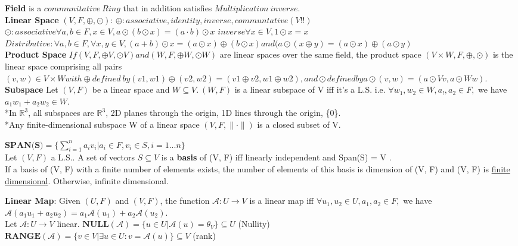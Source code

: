 \documentclass[10pt,landscape]{article}
\begin{document}
\begin{multicols*}{4}
\textbf{Field} is a $communitative\ Ring$ that in addition satisfies $Multiplication\ inverse.$\\

\textbf{Linear Space} $(V, F, \oplus, \odot)$:
$\oplus: associative, identity, inverse, communtative (V!!)$\\
$\odot: associative \forall a,b \in F, x \in V, a \odot (b \odot x) = (a \cdot b) \odot x$
$inverse \forall x \in V, 1 \odot x = x$\\
$Distributive: \forall a, b \in F, \forall x,y \in V, (a+b) \odot x = (a \odot x) \oplus (b \odot x) and (a \odot (x \oplus y) = (a \odot x) \oplus (a \odot y)$\\

\textbf{Product Space} $If (V, F, \oplus V , \odot V ) and (W, F, \oplus W , \odot W)$ are linear spaces over the same field, the product space $(V \times W, F, \oplus, \odot)$ is the linear space comprising all pairs $(v, w) \in V \times W with \oplus defined\ by (v1, w1) \oplus (v2, w2) = (v1 \oplus v2, w1 \oplus w2), and \odot defined by a \odot (v, w) = (a \odot V v, a \odot W w).$\\

\textbf{Subspace} Let $(V, F)$ be a linear space and $W \subseteq V.\ (W, F)$ is a linear subspace of V iff it's a L.S. i.e. $\forall w_1,w_2 \in W, a_!, a_2 \in F,$ we have $a_1w_1 + a_2w_2 \in W$.\\

*In $\mathbb{R} ^ 3$, all subspaces are $\mathbb{R} ^ 3$, 2D planes through the origin, 1D lines through the origin, \{0\}.\\
*Any finite-dimensional subspace W of a linear space  $(V,F,\parallel \cdot \parallel)$ is a closed subset of V.

$\textbf{SPAN(S)}  = \{ \sum_{i=1}^{n} a_iv_i |a_i \in F, v_i \in S, i = 1...n \} $\\

Let $(V, F)$ a L.S.. A set of vectors $S \subseteq V$ is a \textbf{basis} of (V, F) iff linearly independent and Span(S) = V .\\

If a basis of (V, F) with a finite number of elements
exists, the number of elements of this basis is dimension of (V, F) and (V, F) is
\underline{finite dimensional}. Otherwise, infinite dimensional.

\textbf{Linear Map}: Given $(U, F)$ and $(V, F)$, the function $\mathcal{A}: U \to V$ is a linear map iff $\forall u_1,u_2 \in U, a_1,a_2 \in F,$ we have $\mathcal{A}(a_1u_1 + a_2u_2) = a_1\mathcal{A}(u_1) + a_2\mathcal{A}(u_2)$.\\
Let $\mathcal{A}: U \to V$ linear. 
$\textbf{NULL}(\mathcal{A}) = \{ u \in U |\mathcal{A}(u)=\theta_V \} \subseteq U$ (Nullity)\\
$\textbf{RANGE}(\mathcal{A}) = \{  v \in V | \exists u \in U: v = \mathcal{A}(u) \} \subseteq V$ (rank)\\


\end{multicols*}
\end{document}

